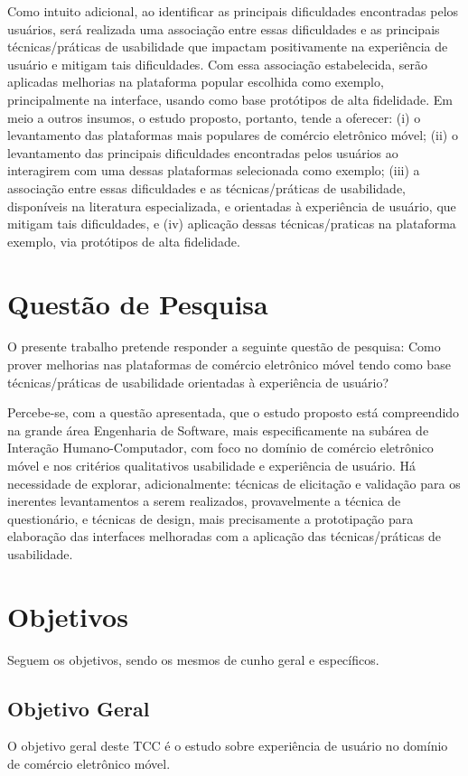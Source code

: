 Como intuito adicional, ao identificar as principais dificuldades encontradas pelos usuários, será realizada uma associação entre essas dificuldades e as principais técnicas/práticas de usabilidade que impactam positivamente na experiência de usuário e mitigam tais dificuldades. Com essa associação estabelecida, serão aplicadas melhorias na plataforma popular escolhida como exemplo, principalmente na interface, usando como base protótipos de alta fidelidade. Em meio a outros insumos, o estudo proposto, portanto, tende a oferecer: (i) o levantamento das plataformas mais populares de comércio eletrônico móvel; (ii) o levantamento das principais dificuldades encontradas pelos usuários ao interagirem com uma dessas plataformas selecionada como exemplo; (iii) a associação entre essas dificuldades e as técnicas/práticas de usabilidade, disponíveis na literatura especializada, e orientadas à experiência de usuário, que mitigam tais dificuldades, e (iv) aplicação dessas técnicas/praticas na plataforma exemplo, via protótipos de alta fidelidade.


\section{Questão de Pesquisa} \label{questao}
O presente trabalho pretende responder a seguinte questão de pesquisa: Como prover melhorias nas plataformas de comércio eletrônico móvel tendo como base técnicas/práticas de usabilidade orientadas à experiência de usuário?

Percebe-se, com a questão apresentada, que o estudo proposto está compreendido na grande área Engenharia de Software, mais especificamente na subárea de Interação Humano-Computador, com foco no domínio de comércio eletrônico móvel e nos critérios qualitativos usabilidade e experiência de usuário. Há necessidade de explorar, adicionalmente: técnicas de elicitação e validação para os inerentes levantamentos a serem realizados, provavelmente a técnica de questionário, e técnicas de design, mais precisamente a prototipação para elaboração das interfaces melhoradas com a aplicação das técnicas/práticas de usabilidade.

\section{Objetivos} \label{ob}
Seguem os objetivos, sendo os mesmos de cunho geral e específicos.

\subsection{Objetivo Geral}
O objetivo geral deste TCC é o estudo sobre experiência de usuário no domínio de comércio eletrônico móvel.

